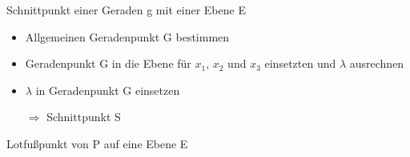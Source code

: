 \documentclass[paper=a6,ngerman,twoside=true,fontsize=14pt, parskip = half]{scrartcl}
\begin{document}
\begin{frage}
	Schnittpunkt einer Geraden g mit einer Ebene E
	
\end{frage}
\begin{antwort}
	\begin{itemize} 
		\item Allgemeinen Geradenpunkt G bestimmen
		\item Geradenpunkt G in die Ebene für $x_1$, $x_2$ und $x_3$ einsetzten und $\lambda$ ausrechnen
		\item $\lambda$ in Geradenpunkt G einsetzen
		
		 $\Rightarrow$ Schnittpunkt S
	\end{itemize}
	
\end{antwort}
\begin{frage}
	Lotfußpunkt von P auf eine Ebene E
	
\end{frage}
\end{document}
